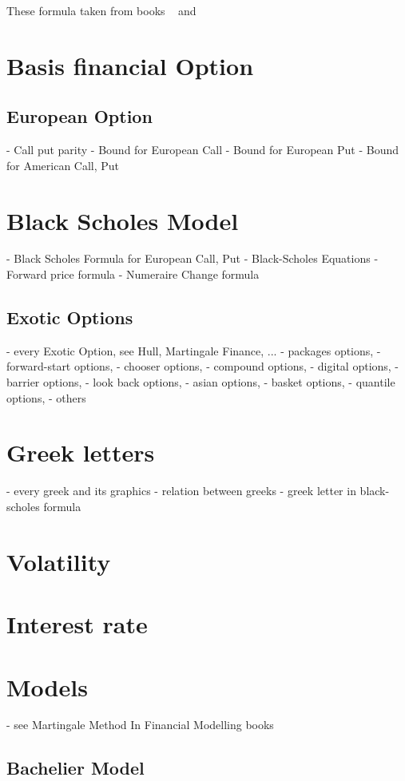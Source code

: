 \documentclass[a4paper,10pt]{article}
\begin{document}
\begin{center}\end{center}
These formula taken from books ~\cite{mathfiElliot} and ~\cite{mathfiMarek} 
\section{Basis financial Option}
\subsection{European Option}
- Call put parity
- Bound for European Call
- Bound for European Put
- Bound for American Call, Put
\section{Black Scholes Model}
- Black Scholes Formula for European Call, Put
- Black-Scholes Equations
- Forward price formula
- Numeraire Change formula
\subsection{Exotic Options}
- every Exotic Option, see Hull, Martingale Finance, ...
- packages options, 
- forward-start options, 
- chooser options, 
- compound options, 
- digital options, 
- barrier options, 
- look back options, 
- asian options, 
- basket options, 
- quantile options, 
- others
\section{Greek letters}
- every greek and its graphics
- relation between greeks
- greek letter in black-scholes formula
\section{Volatility}
\section{Interest rate}
\section{Models}
- see Martingale Method In Financial Modelling books
\subsection{Bachelier Model}
\end{document}
